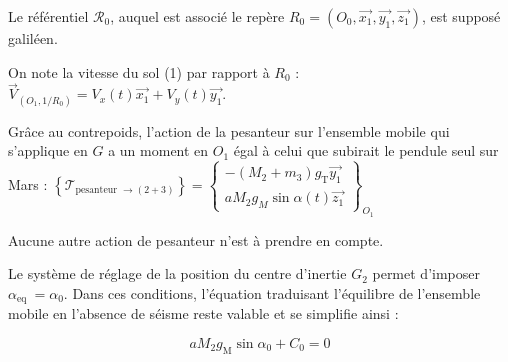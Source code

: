 Le référentiel $\mathcal{R}_{0}$, auquel est associé le repère $R_{0}=\left(O_{0}, \overrightarrow{x_{1}}, \overrightarrow{y_{1}}, \overrightarrow{z_{1}}\right)$, est supposé galiléen.

On note la vitesse du sol (1) par rapport à $R_{0}$ :
$
\vec{V}_{\left(O_{1}, 1 / R_{0}\right)}=V_{x}(t) \overrightarrow{x_{1}}+V_{y}(t) \overrightarrow{y_{1}}
$.

Grâce au contrepoids, l'action de la pesanteur sur l'ensemble mobile qui s'applique en $G$ a un moment en $O_{1}$ égal à celui que subirait le pendule seul sur Mars :
$\left\{\mathcal{T}_{\text {pesanteur } \rightarrow(2+3)}\right\}=\left\{\begin{array}{c}-\left(M_{2}+m_{3}\right) g_{\mathrm{T}} \overrightarrow{y_{1}} \\ a M_{2} g_{M} \sin \alpha(t) \overrightarrow{z_{1}}\end{array}\right\}_{O_{1}}$

Aucune autre action de pesanteur n'est à prendre en compte.

Le système de réglage de la position du centre d'inertie $G_{2}$ permet d'imposer $\alpha_{\text {eq }}=\alpha_{0}$. Dans ces conditions, l'équation traduisant l'équilibre de l'ensemble mobile en l'absence de séisme reste valable et se simplifie ainsi :


\begin{equation*}
a M_{2} g_{\mathrm{M}} \sin \alpha_{0}+C_{0}=0 \tag{eq.1'}
\end{equation*}

